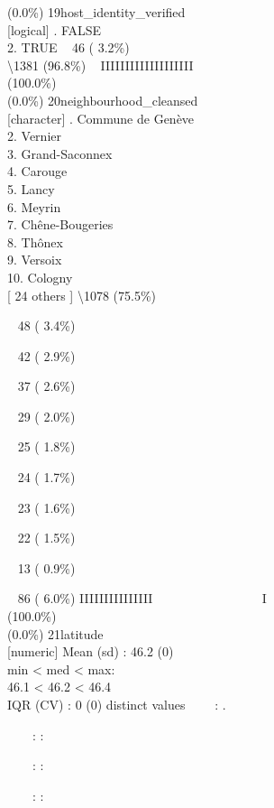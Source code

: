 \documentclass[
  journal,
]{IEEEtran}%
\begin{document}
(0.0\%) \textbar{} \textbar{} 19\textbar host\_identity\_verified\\
{[}logical{]} . FALSE\\
2. TRUE \textbar~ 46 ( 3.2\%)\\
\textbackslash1381 (96.8\%) \textbar{} \textbar~ IIIIIIIIIIIIIIIIIII
\\
(100.0\%) \\
(0.0\%) \textbar{} \textbar{} 20\textbar neighbourhood\_cleansed\\
{[}character{]} . Commune de Genève\\
2. Vernier\\
3. Grand-Saconnex\\
4. Carouge\\
5. Lancy\\
6. Meyrin\\
7. Chêne-Bougeries\\
8. Thônex\\
9. Versoix\\
10. Cologny\\
{[} 24 others {]} \textbar\textbackslash1078 (75.5\%)\\
\strut ~ 48 ( 3.4\%)\\
\strut ~ 42 ( 2.9\%)\\
\strut ~ 37 ( 2.6\%)\\
\strut ~ 29 ( 2.0\%)\\
\strut ~ 25 ( 1.8\%)\\
\strut ~ 24 ( 1.7\%)\\
\strut ~ 23 ( 1.6\%)\\
\strut ~ 22 ( 1.5\%)\\
\strut ~ 13 ( 0.9\%)\\
\strut ~ 86 ( 6.0\%) \textbar{} \textbar IIIIIIIIIIIIIII ~ ~ ~ ~ ~ ~ ~ ~
~ ~ I \\
(100.0\%) \\
(0.0\%) \textbar{} \textbar{} 21\textbar latitude\\
{[}numeric{]} \textbar Mean (sd) : 46.2 (0)\\
min \textless{} med \textless{} max:\\
46.1 \textless{} 46.2 \textless{} 46.4\\
IQR (CV) : 0 (0)  distinct values \textbar{} \textbar~~~~:
.\\
\strut ~~~~: :\\
\strut ~~~~: :\\
\strut ~~~~: :\\
\end{document}
